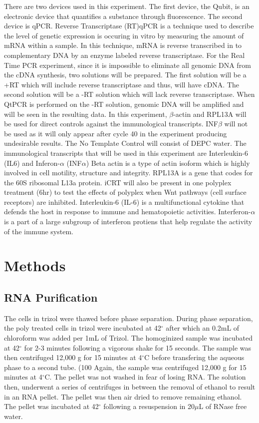 \documentclass[journal, a4paper]{IEEEtran}
\begin{document}
  There are two devices used in this experiment. The first device, the Qubit, is an electronic device that quantifies a substance through fluorescence.
  The second device is qPCR.
  Reverse Transcriptase (RT)qPCR is a technique used to describe the level of genetic expression is occuring in vitro
  by measuring the amount of mRNA within a sample. In this technique, mRNA is reverse transcribed in to complementary DNA by
  an enzyme labeled reverse transcriptase.
  For the Real Time PCR experiment, since it is impossible to eliminate all genomic DNA from the cDNA synthesis, two solutions will be prepared.
  The first solution will be a +RT which will include reverse transcriptase and thus, will have cDNA.
  The second solution will be a -RT solution which will lack reverse transcriptase.
  When QtPCR is performed on the -RT solution, genomic DNA will be amplified and will be seen in the resulting data.
  In this experiment, $\beta$-actin and RPL13A will be used for direct controls against the immunological transcripts.
  INF$\beta$ will not be used as it will only appear after cycle 40 in the experiment producing undesirable results.
  The No Template Control will consist of DEPC water.
  The immunological transcripts that will be used in this experiment are Interleukin-6 (IL6) and Inferon-$\alpha$ (INF$\alpha$)
  Beta actin is a type of actin isoform which is highly involved in cell motility, structure and integrity.
  RPL13A is a gene that codes for the 60S ribosomal L13a protein. iCRT will also be present in one polyplex treatment (6hr)
  to test the effects of polyplex when Wnt pathways (cell surface receptors) are inhibited.
  Interleukin-6 (IL-6) is a multifunctional cytokine that defends the host in response to immune and hematopoietic activities.
  Interferon-$\alpha$ is a part of a large subgroup of interferon protiens that help regulate the activity of the immune system.

\section{Methods}
    \subsection{RNA Purification}
      The cells in trizol were thawed before phase separation. During phase separation,
      the poly treated cells in trizol were incubated at 42$^{\circ}$ after which an 0.2mL of chloroform was added per 1mL of Trizol.
      The homoginized sample was incubated at 42$^{\circ}$ for 2-3 minutes following a vigorous shake for 15 seconds.
      The sample was then centrifuged 12,000 g for 15 minutes at 4$^{\circ}$C before transfering the aqueous phase
      to a second tube. (100%
      Again, the sample was centrifuged 12,000 g for 15 minutes at 4$^{\circ}$C.
      The pellet was not washed in fear of losing RNA.
      The solution then, underwent a series of centrifuges in between the removal of ethanol to result in an RNA pellet.
      The pellet was then air dried to remove remaining ethanol.
      The pellet was incubated at 42$^{\circ}$ following a resuspension in 20$\mu$L of RNase free water.
\end{document}
